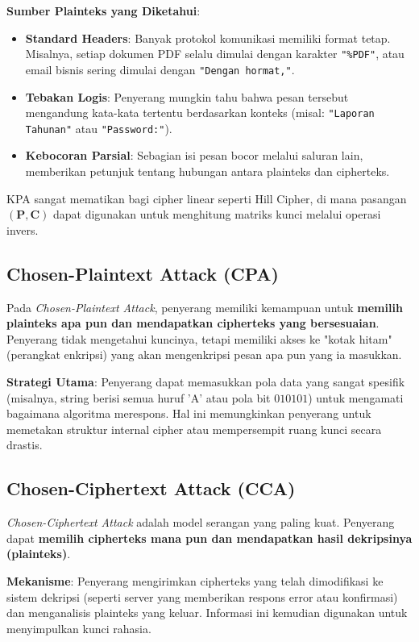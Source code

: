 \textbf{Sumber Plainteks yang Diketahui}:
\begin{itemize}
    \item \textbf{Standard Headers}: Banyak protokol komunikasi memiliki format tetap. Misalnya, setiap dokumen PDF selalu dimulai dengan karakter \texttt{"\%PDF"}, atau email bisnis sering dimulai dengan \texttt{"Dengan hormat,"}.
    \item \textbf{Tebakan Logis}: Penyerang mungkin tahu bahwa pesan tersebut mengandung kata-kata tertentu berdasarkan konteks (misal: \texttt{"Laporan Tahunan"} atau \texttt{"Password:"}).
    \item \textbf{Kebocoran Parsial}: Sebagian isi pesan bocor melalui saluran lain, memberikan petunjuk tentang hubungan antara plainteks dan cipherteks.
\end{itemize}
KPA sangat mematikan bagi cipher linear seperti Hill Cipher, di mana pasangan $(\mathbf{P}, \mathbf{C})$ dapat digunakan untuk menghitung matriks kunci melalui operasi invers.

\subsection{Chosen-Plaintext Attack (CPA)}

Pada \textit{Chosen-Plaintext Attack}, penyerang memiliki kemampuan untuk \textbf{memilih plainteks apa pun dan mendapatkan cipherteks yang bersesuaian}. Penyerang tidak mengetahui kuncinya, tetapi memiliki akses ke "kotak hitam" (perangkat enkripsi) yang akan mengenkripsi pesan apa pun yang ia masukkan.

\textbf{Strategi Utama}:
Penyerang dapat memasukkan pola data yang sangat spesifik (misalnya, string berisi semua huruf 'A' atau pola bit $010101$) untuk mengamati bagaimana algoritma merespons. Hal ini memungkinkan penyerang untuk memetakan struktur internal cipher atau mempersempit ruang kunci secara drastis.

\subsection{Chosen-Ciphertext Attack (CCA)}

\textit{Chosen-Ciphertext Attack} adalah model serangan yang paling kuat. Penyerang dapat \textbf{memilih cipherteks mana pun dan mendapatkan hasil dekripsinya (plainteks)}.

\textbf{Mekanisme}:
Penyerang mengirimkan cipherteks yang telah dimodifikasi ke sistem dekripsi (seperti server yang memberikan respons error atau konfirmasi) dan menganalisis plainteks yang keluar. Informasi ini kemudian digunakan untuk menyimpulkan kunci rahasia.


